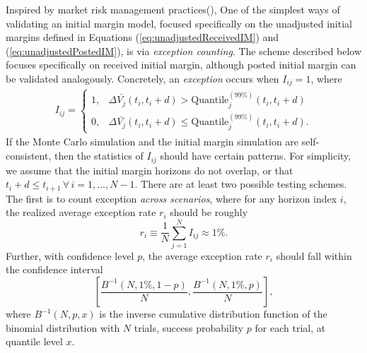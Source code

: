 \documentclass[preprint,12pt]{elsarticle}
\begin{document}
Inspired by market risk management practices(\citep{Basel1996VaRBacktesting}), One of the simplest ways of validating an initial margin model, focused specifically on the unadjusted initial margins defined in Equations (\ref{eq:unadjustedReceivedIM}) and (\ref{eq:unadjustedPostedIM}), is via \emph{exception counting}. The scheme described below focuses specifically on received initial margin, although posted initial margin can be validated analogously. Concretely, an \emph{exception} occurs when $I_{ij}=1$, where
\begin{eqnarray}
I_{ij}=\begin{cases}
1, & \Delta\bar{V_{j}}(t_{i},t_{i}+d) > \textrm{Quantile}_{j}^{(99\%)}(t_{i},t_{i}+d)\\
0, & \Delta\bar{V_{j}}(t_{i},t_{i}+d) \leq \textrm{Quantile}_{j}^{(99\%)}(t_{i},t_{i}+d).
\end{cases}
\end{eqnarray}
If the Monte Carlo simulation and the initial margin simulation are self-consistent, then the statistics of $I_{ij}$ should have certain patterns. For simplicity, we assume that the initial margin horizons do not overlap, or that $t_{i}+d \leq t_{i+1} \, \forall \, i=1,...,N-1$. There are at least two possible testing schemes. The first is to count exception \emph{across scenarios}, where for any horizon index $i$, the realized average exception rate $r_i$ should be roughly
\begin{equation}
r_i \equiv \frac{1}{N}\sum_{j=1}^{N}I_{ij}\approx 1\%.
\end{equation}
Further, with confidence level $p$, the average exception rate $r_i$ should fall within the confidence interval
\begin{equation}
\left[\frac{B^{-1}(N,1\%,1-p)}{N},\frac{B^{-1}(N,1\%,p)}{N}\right],
\end{equation}
where $B^{-1}(N,p,x)$ is the inverse cumulative distribution function of the binomial distribution with $N$ trials, success probability $p$ for each trial, at quantile level $x$. 
\end{document}
